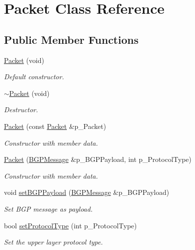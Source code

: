 \hypertarget{classPacket}{\section{Packet Class Reference}
\label{classPacket}
}
\subsection*{Public Member Functions}
\begin{DoxyCompactItemize}
\item 
\hyperlink{classPacket_a421cbed17ae12cd3e9941f8adc788e54}{Packet} (void)
\begin{DoxyCompactList}\small\item\em Default constructor. \end{DoxyCompactList}\item 
\hyperlink{classPacket_a15a1f007e2e37e855e5533c27fc3fb7b}{$\sim$\-Packet} (void)
\begin{DoxyCompactList}\small\item\em Destructor. \end{DoxyCompactList}\item 
\hyperlink{classPacket_a7c102fea0b78944fb8391d35d643898c}{Packet} (const \hyperlink{classPacket}{Packet} \&p\-\_\-\-Packet)
\begin{DoxyCompactList}\small\item\em Constructor with member data. \end{DoxyCompactList}\item 
\hyperlink{classPacket_afb9f290d6e42db32d3888e902dc7ae50}{Packet} (\hyperlink{classBGPMessage}{B\-G\-P\-Message} \&p\-\_\-\-B\-G\-P\-Payload, int p\-\_\-\-Protocol\-Type)
\begin{DoxyCompactList}\small\item\em Constructor with member data. \end{DoxyCompactList}\item 
void \hyperlink{classPacket_a90ef09654230e093510fea3f42a88777}{set\-B\-G\-P\-Payload} (\hyperlink{classBGPMessage}{B\-G\-P\-Message} \&p\-\_\-\-B\-G\-P\-Payload)
\begin{DoxyCompactList}\small\item\em Set B\-G\-P message as payload. \end{DoxyCompactList}\item 
bool \hyperlink{classPacket_a14f94e97dfcaeaeebe7dc04b5ca71de1}{set\-Protocol\-Type} (int p\-\_\-\-Protocol\-Type)
\begin{DoxyCompactList}\small\item\em Set the upper layer protocol type. \end{DoxyCompactList}\item 

\end{DoxyCompactItemize}
